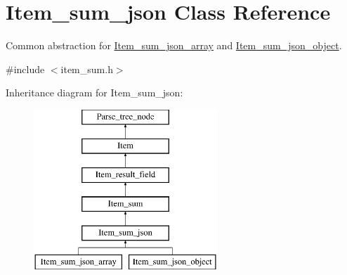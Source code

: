 \hypertarget{classItem__sum__json}{}\section{Item\+\_\+sum\+\_\+json Class Reference}
\label{classItem__sum__json}


Common abstraction for \mbox{\hyperlink{classItem__sum__json__array}{Item\+\_\+sum\+\_\+json\+\_\+array}} and \mbox{\hyperlink{classItem__sum__json__object}{Item\+\_\+sum\+\_\+json\+\_\+object}}.  




{\ttfamily \#include $<$item\+\_\+sum.\+h$>$}

Inheritance diagram for Item\+\_\+sum\+\_\+json\+:\begin{figure}[H]
\begin{center}
\leavevmode
\includegraphics[height=6.000000cm]{classItem__sum__json}
\end{center}
\end{figure}
